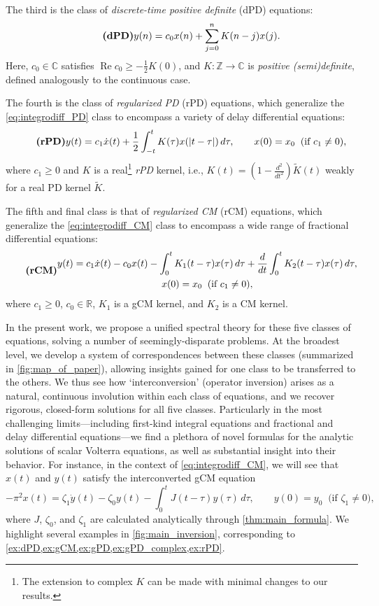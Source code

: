 \documentclass{cams-l} %
\newcommand{\CC}{\mathbb C}
\newcommand{\RR}{\mathbb R}
\newcommand{\ZZ}{\mathbb Z}
\newcommand{\op}{\operatorname}
\renewcommand{\Re}{\op{Re}}
\theoremstyle{definition}
\theoremstyle{remark}
\numberwithin{equation}{section}
\begin{document}
The third is the class of \emph{discrete-time positive definite} (dPD) equations:
\begin{equation}\tag*{\textbf{(dPD)}}\label{eq:integrodiff_dPD}
    y(n) = c_0x(n) + \sum_{j=0}^n K(n-j)x(j).
\end{equation}
Here, $c_0\in\CC$ satisfies $\Re c_0\geq -\frac{1}{2}K(0)$, and $K:\ZZ\to\CC$ is \emph{positive (semi)definite}, defined analogously to the continuous case.

The fourth is the class of \emph{regularized PD} (rPD) equations, which generalize the \ref{eq:integrodiff_PD} class to encompass a variety of delay differential equations:
\begin{equation}\tag*{\textbf{(rPD)}}\label{eq:integrodiff_rPD}
	y(t) = c_1\dot{x}(t) + \frac{1}{2}\int_{-t}^t K(\tau)x(|t-\tau|)\,d\tau,\qquad x(0) = x_0\;\;\text{(if }c_1\neq 0\text{)},
\end{equation}
where $c_1\geq 0$ and $K$ is a real\footnote{The extension to complex $K$ can be made with minimal changes to our results.} \emph{rPD} kernel, i.e., $K(t)=(1-\frac{d^2}{dt^2})\widetilde{K}(t)$ weakly for a real PD kernel $\widetilde{K}$.

The fifth and final class is that of \emph{regularized CM} (rCM) equations, which generalize the \ref{eq:integrodiff_CM} class to encompass a wide range of fractional differential equations:
\begin{equation}\tag*{\textbf{(rCM)}}\label{eq:integrodiff_rCM}
    \begin{gathered}
	y(t) = c_1\dot{x}(t) - c_0x(t) - \int_0^t K_1(t-\tau)x(\tau)\,d\tau + \frac{d}{dt}\int_{0}^t K_2(t-\tau)x(\tau)\,d\tau,\\
    x(0) = x_0\;\;\text{(if }c_1\neq 0\text{)},
    \end{gathered}
\end{equation}
where $c_1\geq 0$, $c_0\in\RR$, $K_1$ is a gCM kernel, and $K_2$ is a CM kernel.

In the present work, we propose a unified spectral theory for these five classes of equations, solving a number of seemingly-disparate problems. At the broadest level, we develop a system of correspondences between these classes (summarized in \cref{fig:map_of_paper}), allowing insights gained for one class to be transferred to the others. We thus see how `interconversion' (operator inversion) arises as a natural, continuous involution within each class of equations, and we recover rigorous, closed-form solutions for all five classes. Particularly in the most challenging limits---including first-kind integral equations and fractional and delay differential equations---we find a plethora of novel formulas for the analytic solutions of scalar Volterra equations, as well as substantial insight into their behavior. For instance, in the context of \ref{eq:integrodiff_CM}, we will see that $x(t)$ and $y(t)$ satisfy the interconverted gCM equation
\[-\pi^2 x(t) = \zeta_1\dot{y}(t) - \zeta_0y(t) - \int_0^tJ(t-\tau)y(\tau)\,d\tau,\qquad y(0) = y_0\;\;\text{(if }\zeta_1\neq 0\text{)},\]
where $J$, $\zeta_0$, and $\zeta_1$ are calculated analytically through \cref{thm:main_formula}. We highlight several examples in \cref{fig:main_inversion}, corresponding to \cref{ex:dPD,ex:gCM,ex:gPD,ex:gPD_complex,ex:rPD}.
\end{document}
